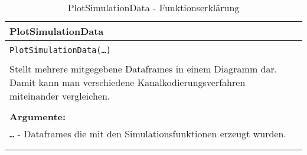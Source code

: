 \begin{longtable}{|p{\textwidth}|}
\hline
\rowcolor{lightblue}PlotSimulationData\\
\hline
\\
\texttt{PlotSimulationData(\dots)}\\
\\
Stellt mehrere mitgegebene Dataframes in einem Diagramm dar. Damit kann man verschiedene Kanalkodierungsverfahren miteinander vergleichen.\\
\\
\textbf{Argumente:}\\
\texttt{\dots} - Dataframes die mit den Simulationsfunktionen erzeugt wurden.\\	
\\
\hline
\caption{PlotSimulationData - Funktionserklärung}
\end{longtable}